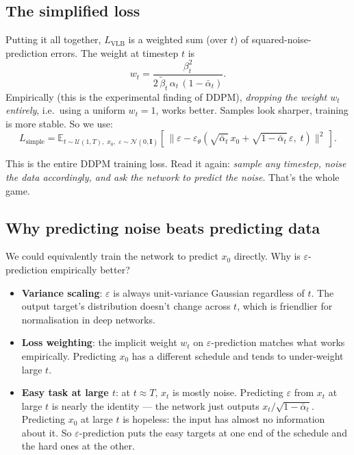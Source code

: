 \documentclass[11pt,a4paper]{article}
\newcommand{\E}{\mathbb{E}}
\newcommand{\N}{\mathcal{N}}
\newcommand{\eps}{\varepsilon}
\begin{document}
\subsection{The simplified loss}

Putting it all together, $L_{\text{VLB}}$ is a weighted sum (over $t$)
of squared-noise-prediction errors. The weight at timestep $t$ is
\[
w_t = \frac{\beta_t^2}{2\,\tilde\beta_t\,\alpha_t\,(1-\bar{\alpha}_t)}.
\]
Empirically (this is the experimental finding of DDPM), \emph{dropping
the weight $w_t$ entirely}, i.e.\ using a uniform $w_t = 1$, works
better. Samples look sharper, training is more stable. So we use:
\begin{equation}
\boxed{\;
L_{\text{simple}} = \E_{t \sim \mathcal{U}(1,T),\; x_0,\; \eps \sim \N(0,\mathbf{I})}
   \left[\, \big\| \eps - \eps_\theta(\sqrt{\bar{\alpha}_t}\, x_0 + \sqrt{1-\bar{\alpha}_t}\,\eps,\; t) \big\|^2 \,\right].\;}
\label{eq:l-simple}
\end{equation}

This is the entire DDPM training loss. Read it again: \emph{sample any
timestep, noise the data accordingly, and ask the network to predict
the noise}. That's the whole game.

\subsection{Why predicting noise beats predicting data}

We could equivalently train the network to predict $x_0$ directly. Why
is $\eps$-prediction empirically better?

\begin{itemize}[leftmargin=*]
\item \textbf{Variance scaling}: $\eps$ is always unit-variance Gaussian
  regardless of $t$. The output target's distribution doesn't change
  across $t$, which is friendlier for normalisation in deep networks.
\item \textbf{Loss weighting}: the implicit weight $w_t$ on
  $\eps$-prediction matches what works empirically. Predicting $x_0$ has
  a different schedule and tends to under-weight large $t$.
\item \textbf{Easy task at large $t$}: at $t \approx T$, $x_t$ is mostly
  noise. Predicting $\eps$ from $x_t$ at large $t$ is nearly the
  identity --- the network just outputs $x_t/\sqrt{1-\bar{\alpha}_t}$.
  Predicting $x_0$ at large $t$ is hopeless: the input has almost no
  information about it. So $\eps$-prediction puts the easy targets at
  one end of the schedule and the hard ones at the other.
\end{itemize}
\end{document}
